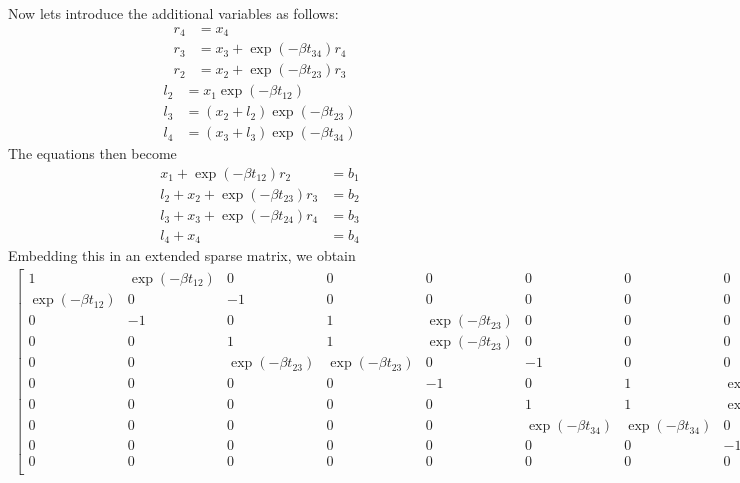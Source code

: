 \documentclass[final,leqno]{siamltex}
\begin{document}
Now lets introduce the additional variables as follows:
\begin{align}
r_4 & = x_4\\
r_3 & = x_3 + \exp(-\beta t_{34})r_4\\
r_2 & = x_2 + \exp(-\beta t_{23})r_3
\end{align}
\begin{align}
l_2 & = x_1\exp(-\beta t_{12})\\
l_3 & = (x_2+l_2)\exp(-\beta t_{23})\\
l_4 & = (x_3+l_3)\exp(-\beta t_{34})
\end{align}
The equations then become
\begin{align}
x_1 + \exp(-\beta t_{12}) r_2 & = b_1\\
l_2 + x_2 + \exp(-\beta t_{23}) r_3 & = b_2\\
l_3 + x_3 + \exp(-\beta t_{24}) r_4 & = b_3\\
l_4 + x_4 & = b_4
\end{align}
Embedding this in an extended sparse matrix, we obtain
\begin{align}
\begin{bmatrix}
1 & \exp(-\beta t_{12}) & 0 & 0 & 0 & 0 & 0 & 0 & 0 & 0\\
\exp(-\beta t_{12}) & 0 & -1 & 0 & 0 & 0 & 0 & 0 & 0 & 0\\
0 & -1 & 0 & 1 & \exp(-\beta t_{23}) & 0 & 0 & 0 & 0 & 0\\
0 & 0 & 1 & 1 & \exp(-\beta t_{23}) & 0 & 0 & 0 & 0 & 0\\
0 & 0 & \exp(-\beta t_{23}) & \exp(-\beta t_{23}) & 0 & -1 & 0 & 0 & 0 & 0\\
0 & 0 & 0 & 0 & -1 & 0 & 1 & \exp(-\beta t_{34}) & 0 & 0\\
0 & 0 & 0 & 0 & 0 & 1 & 1 & \exp(-\beta t_{34}) & 0 & 0\\
0 & 0 & 0 & 0 & 0 & \exp(-\beta t_{34}) & \exp(-\beta t_{34}) & 0 & -1 & 0\\
0 & 0 & 0 & 0 & 0 & 0 & 0 & -1 & 0 & 1\\
0 & 0 & 0 & 0 & 0 & 0 & 0 & 0 & 1 & 1\\
\end{bmatrix}
\begin{bmatrix}
x_1\\ r_2\\ l_1\\ x_2\\ r_3\\ l_2\\ x_3\\ r_4\\ l_3\\ x_4
\end{bmatrix}
=
\begin{bmatrix}
b_1\\ 0\\ 0\\ b_2\\ 0\\ 0\\ b_3\\ 0\\ 0\\ b_4
\end{bmatrix}
\end{align}
\end{document}
